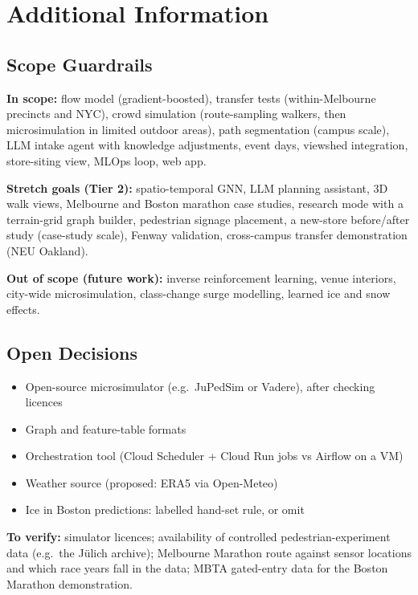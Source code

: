 \documentclass[11pt]{article}
\begin{document}
\section{Additional Information}

\subsection{Scope Guardrails}

\textbf{In scope:} flow model (gradient-boosted), transfer tests (within-Melbourne precincts and NYC), crowd simulation (route-sampling walkers, then microsimulation in limited outdoor areas), path segmentation (campus scale), LLM intake agent with knowledge adjustments, event days, viewshed integration, store-siting view, MLOps loop, web app.

\textbf{Stretch goals (Tier 2):} spatio-temporal GNN, LLM planning assistant, 3D walk views, Melbourne and Boston marathon case studies, research mode with a terrain-grid graph builder, pedestrian signage placement, a new-store before/after study (case-study scale), Fenway validation, cross-campus transfer demonstration (NEU Oakland).

\textbf{Out of scope (future work):} inverse reinforcement learning, venue interiors, city-wide microsimulation, class-change surge modelling, learned ice and snow effects.

\subsection{Open Decisions}
\begin{itemize}
  \item Open-source microsimulator (e.g.\ JuPedSim or Vadere), after checking licences
  \item Graph and feature-table formats
  \item Orchestration tool (Cloud Scheduler + Cloud Run jobs vs Airflow on a VM)
  \item Weather source (proposed: ERA5 via Open-Meteo)
  \item Ice in Boston predictions: labelled hand-set rule, or omit
\end{itemize}

\textbf{To verify:} simulator licences; availability of controlled pedestrian-experiment data (e.g.\ the J\"ulich archive); Melbourne Marathon route against sensor locations and which race years fall in the data; MBTA gated-entry data for the Boston Marathon demonstration.
\end{document}
